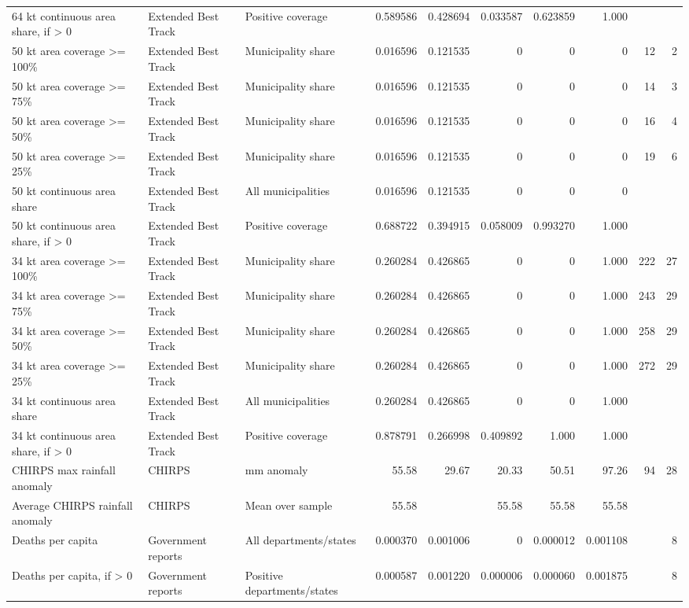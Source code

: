 \begin{minipage}{\linewidth}
{\begin{tabular}{lllrrrrrrr}
64 kt continuous area share, if > 0 & Extended Best Track & Positive coverage & 0.589586 & 0.428694 & 0.033587 & 0.623859 & 1.000 &  &  \\
50 kt area coverage >= 100\% & Extended Best Track & Municipality share & 0.016596 & 0.121535 & 0 & 0 & 0 & 12 & 2 \\
50 kt area coverage >= 75\% & Extended Best Track & Municipality share & 0.016596 & 0.121535 & 0 & 0 & 0 & 14 & 3 \\
50 kt area coverage >= 50\% & Extended Best Track & Municipality share & 0.016596 & 0.121535 & 0 & 0 & 0 & 16 & 4 \\
50 kt area coverage >= 25\% & Extended Best Track & Municipality share & 0.016596 & 0.121535 & 0 & 0 & 0 & 19 & 6 \\
50 kt continuous area share & Extended Best Track & All municipalities & 0.016596 & 0.121535 & 0 & 0 & 0 &  &  \\
50 kt continuous area share, if > 0 & Extended Best Track & Positive coverage & 0.688722 & 0.394915 & 0.058009 & 0.993270 & 1.000 &  &  \\
34 kt area coverage >= 100\% & Extended Best Track & Municipality share & 0.260284 & 0.426865 & 0 & 0 & 1.000 & 222 & 27 \\
34 kt area coverage >= 75\% & Extended Best Track & Municipality share & 0.260284 & 0.426865 & 0 & 0 & 1.000 & 243 & 29 \\
34 kt area coverage >= 50\% & Extended Best Track & Municipality share & 0.260284 & 0.426865 & 0 & 0 & 1.000 & 258 & 29 \\
34 kt area coverage >= 25\% & Extended Best Track & Municipality share & 0.260284 & 0.426865 & 0 & 0 & 1.000 & 272 & 29 \\
34 kt continuous area share & Extended Best Track & All municipalities & 0.260284 & 0.426865 & 0 & 0 & 1.000 &  &  \\
34 kt continuous area share, if > 0 & Extended Best Track & Positive coverage & 0.878791 & 0.266998 & 0.409892 & 1.000 & 1.000 &  &  \\
CHIRPS max rainfall anomaly & CHIRPS & mm anomaly & 55.58 & 29.67 & 20.33 & 50.51 & 97.26 & 94 & 28 \\
Average CHIRPS rainfall anomaly & CHIRPS & Mean over sample & 55.58 &  & 55.58 & 55.58 & 55.58 &  &  \\
Deaths per capita & Government reports & All departments/states & 0.000370 & 0.001006 & 0 & 0.000012 & 0.001108 &  & 8 \\
Deaths per capita, if > 0 & Government reports & Positive departments/states & 0.000587 & 0.001220 & 0.000006 & 0.000060 & 0.001875 &  & 8 \\

\end{tabular}}
\end{minipage}
